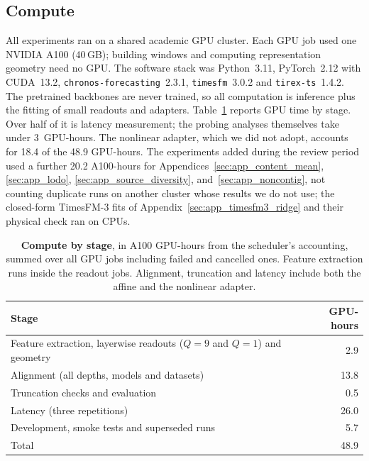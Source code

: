 \documentclass{article} %
\begin{document}
\subsection{Compute}
\label{app:compute}

All experiments ran on a shared academic GPU cluster. Each GPU job used one NVIDIA A100 (40\,GB);
building windows and computing representation geometry need no GPU. The software stack was
Python~3.11, PyTorch~2.12 with CUDA~13.2, \texttt{chronos-forecasting}~2.3.1, \texttt{timesfm}~3.0.2
and \texttt{tirex-ts}~1.4.2. The pretrained backbones are never trained, so all computation is
inference plus the fitting of small readouts and adapters. Table~\ref{tab:compute} reports GPU time
by stage. Over half of it is latency measurement; the probing analyses themselves take under
3~GPU-hours. The nonlinear adapter, which we did not adopt, accounts for 18.4 of the 48.9
GPU-hours. The experiments added during the review period used a further 20.2 A100-hours for
Appendices~\ref{sec:app_content_mean}, \ref{sec:app_lodo}, \ref{sec:app_source_diversity},
and~\ref{sec:app_noncontig}, not counting duplicate runs on another cluster whose results we do not
use; the closed-form TimesFM-3 fits of Appendix~\ref{sec:app_timesfm3_ridge} and their physical check
ran on CPUs.

\begin{table}[h]
  \centering
  \small
  \vspace{4pt}
  \caption{\textbf{Compute by stage}, in A100 GPU-hours from the scheduler's accounting, summed
  over all GPU jobs including failed and cancelled ones. Feature extraction runs inside the readout
  jobs. Alignment, truncation and latency include both the affine and the nonlinear adapter.}
  \label{tab:compute}
  \begin{tabular}{@{}lr@{}}
    \toprule
    Stage & GPU-hours \\
    \midrule
    Feature extraction, layerwise readouts ($Q=9$ and $Q=1$) and geometry & 2.9 \\
    Alignment (all depths, models and datasets) & 13.8 \\
    Truncation checks and evaluation & 0.5 \\
    Latency (three repetitions) & 26.0 \\
    Development, smoke tests and superseded runs & 5.7 \\
    \midrule
    Total & 48.9 \\
    \bottomrule
  \end{tabular}
\end{table}
\end{document}
